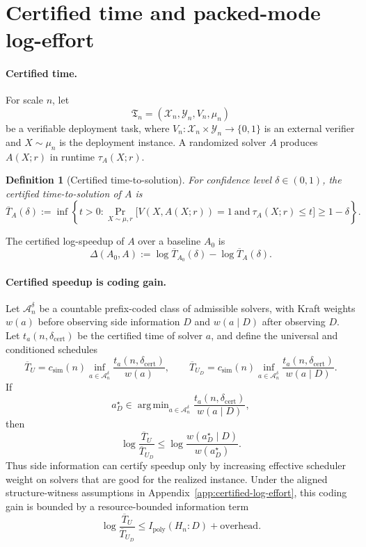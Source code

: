 \documentclass{article}
\newtheorem{definition}{Definition}
\DeclareMathOperator*{\argmin}{arg\,min}
\newcommand{\cA}{\mathcal{A}}
\newcommand{\cX}{\mathcal{X}}
\newcommand{\cY}{\mathcal{Y}}
\begin{document}
\section{Certified time and packed-mode log-effort}
\label{subsec:certified-time-packed}

\paragraph{Certified time.}
For scale \(n\), let
\[
    \mathfrak T_n=(\cX_n,\cY_n,V_n,\mu_n)
\]
be a verifiable deployment task, where \(V_n:\cX_n\times\cY_n\to\{0,1\}\) is an
external verifier and \(X\sim\mu_n\) is the deployment instance.  A randomized solver
\(A\) produces \(A(X;r)\) in runtime \(\tau_A(X;r)\).

\begin{definition}[Certified time-to-solution]
\label{def:certified-time}
For confidence level \(\delta\in(0,1)\), the certified time-to-solution
of \(A\) is
\[
    \overline T_A(\delta)
    :=
    \inf\left\{
        t>0:
        \Pr_{X\sim\mu,r}
        \big[
            V(X,A(X;r))=1
            \ \mathrm{and}\
            \tau_A(X;r)\le t
        \big]
        \ge 1-\delta
    \right\}.
\]
\end{definition}
The certified log-speedup of \(A\) over a baseline \(A_0\) is
\[
    \Delta(A_0,A)
    :=
    \log \overline T_{A_0}(\delta)
    -
    \log \overline T_A(\delta).
\]

\paragraph{Certified speedup is coding gain.}
Let \(\cA_n^\delta\) be a countable prefix-coded class of admissible solvers, with Kraft
weights \(w(a)\) before observing side information \(D\) and \(w(a\mid D)\) after observing
\(D\).  Let \(t_a(n,\delta_{\mathrm{cert}})\) be the certified time of solver \(a\), and define
the universal and conditioned schedules
\[
    \overline T_U
    =
    c_{\mathrm{sim}}(n)
    \inf_{a\in\cA_n^\delta}
    \frac{t_a(n,\delta_{\mathrm{cert}})}{w(a)},
    \qquad
    \overline T_{U_D}
    =
    c_{\mathrm{sim}}(n)
    \inf_{a\in\cA_n^\delta}
    \frac{t_a(n,\delta_{\mathrm{cert}})}{w(a\mid D)}.
\]
If
\[
    a_D^\star
    \in
    \argmin_{a\in\cA_n^\delta}
    \frac{t_a(n,\delta_{\mathrm{cert}})}{w(a\mid D)},
\]
then
\[
\boxed{
    \log\frac{\overline T_U}{\overline T_{U_D}}
    \le
    \log\frac{w(a_D^\star\mid D)}{w(a_D^\star)} .
}
\]
Thus side information can certify speedup only by increasing effective scheduler weight on
solvers that are good for the realized instance.  Under the aligned structure-witness
assumptions in Appendix~\ref{app:certified-log-effort}, this coding gain is bounded by a
resource-bounded information term
\[
    \log\frac{\overline T_U}{\overline T_{U_D}}
    \le
    I_{\mathrm{poly}}(H_n:D)+\mathrm{overhead}.
\]
\end{document}

